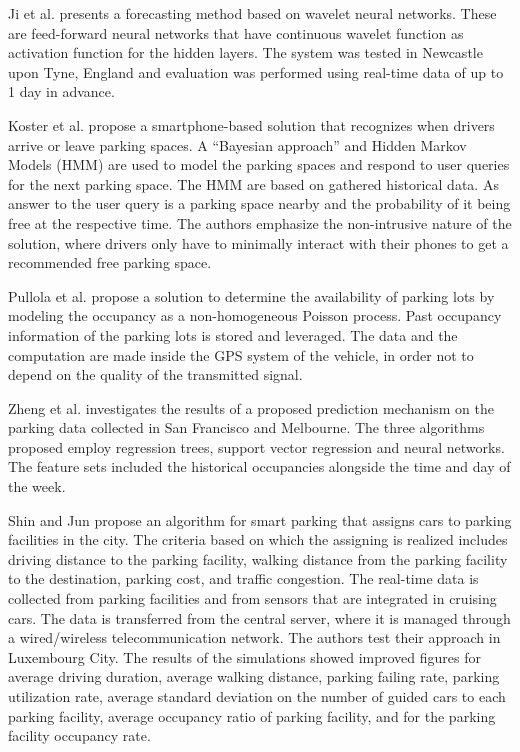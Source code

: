 Ji et al. \cite{ji} presents a forecasting method based on wavelet neural networks. These are feed-forward neural networks that have continuous wavelet function as activation function for the hidden layers. The system was tested in Newcastle upon Tyne, England and evaluation was performed using real-time data of up to 1 day in advance.

Koster et al. \cite{koster} propose a smartphone-based solution that recognizes when drivers arrive or leave parking spaces. A ``Bayesian approach'' and Hidden Markov Models (HMM) are used to model the parking spaces and respond to user queries for the next parking space. The HMM are based on gathered historical data. As answer to the user query is a parking space nearby and the probability of it being free at the respective time. The authors emphasize the non-intrusive nature of the solution, where drivers only have to minimally interact with their phones to get a recommended free parking space.

Pullola et al. \cite{pullola} propose a solution to determine the availability of parking lots by modeling the occupancy as a non-homogeneous Poisson process. Past occupancy information of the parking lots is stored and leveraged. The data and the computation are made inside the GPS system of the vehicle, in order not to depend on the quality of the transmitted signal. 

Zheng et al. \cite{zheng} investigates the results of a proposed prediction mechanism on the parking data collected in San Francisco and Melbourne. The three algorithms proposed employ regression trees, support vector regression and neural networks. The feature sets included the historical occupancies alongside the time and day of the week.

Shin and Jun \cite{shin} propose an algorithm for smart parking that assigns cars to parking facilities in the city. The criteria based on which the assigning is realized includes driving distance to the parking facility, walking distance from the parking facility to the destination, parking cost, and traffic congestion. The real-time data is collected from parking facilities and from sensors that are integrated in cruising cars. The data is transferred from the central server, where it is managed through a wired/wireless telecommunication network. The authors test their approach in Luxembourg City. The results of the simulations showed improved figures for average driving duration, average walking distance, parking failing rate, parking utilization rate, average standard deviation on the number of guided cars to each parking facility, average occupancy ratio of parking facility, and for the parking facility occupancy rate.  


